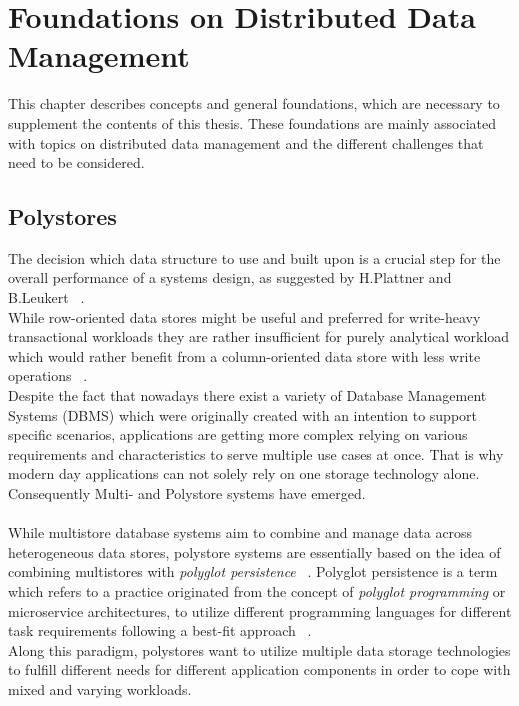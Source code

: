 \chapter{Foundations on Distributed Data Management}
\label{c:Foundation}

This chapter describes concepts and general foundations, which are necessary to supplement 
the contents of this thesis. These foundations are mainly associated with topics on distributed data management
and the different challenges that need to be considered.


\section{Polystores}

The decision which data structure to use and built upon is a crucial step for the overall performance of a systems design, as suggested by
H.Plattner and B.Leukert ~\cite{plattner2015}.\\
While row-oriented data stores might be useful and preferred for write-heavy transactional 
workloads they are rather insufficient for purely analytical workload which would rather benefit from a
column-oriented data store with less write operations ~\cite{sigmond2008}.\\

Despite the fact that nowadays there exist a variety of Database Management Systems (DBMS) which were originally created with an intention to
support specific scenarios,
applications are getting more complex relying on various requirements and characteristics 
to serve multiple use cases at once.
That is why modern day applications can not solely rely on one storage technology alone. 
Consequently Multi- and Polystore systems have emerged. \\
\\
While multistore database systems aim to combine and manage data across heterogeneous data stores,
polystore systems are essentially based on the idea of combining multistores with
\textit{polyglot persistence} ~\cite{polypheny2020}.
Polyglot persistence is a term which refers to a practice originated from the concept 
of \textit{polyglot programming} or microservice architectures, to utilize different 
programming languages for different task requirements following a best-fit approach ~\cite{fowler2011}. \\
Along this paradigm, polystores want to utilize multiple data storage technologies to
fulfill different needs for different application components in order to cope
with mixed and varying workloads.


